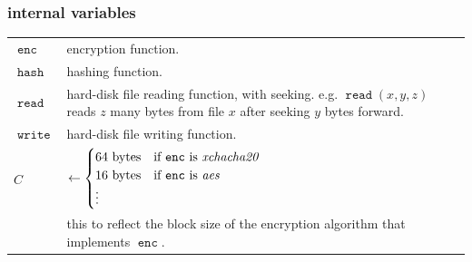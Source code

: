 \documentclass[twocolumn]{article}
\DeclareMathOperator{\fread}{\mathtt{read}}
\DeclareMathOperator{\fwrite}{\mathtt{write}}
\DeclareMathOperator{\enc}{\mathtt{enc}}
\DeclareMathOperator{\hash}{\mathtt{hash}}
\begin{document}
\subsubsection{internal variables}
\begin{tabularx}{\columnwidth}{lX}
    $\enc$      & encryption function.\\
    $\hash$     & hashing function.\\
    $\fread$    & hard-disk file reading function, with seeking.  e.g.
                    $\fread(x, y, z)$ reads $z$ many bytes from file $x$
                    after seeking $y$ bytes forward.\\
    $\fwrite$   & hard-disk file writing function.\\
    $C$         & $\gets \begin{cases}
                        64 \text{ bytes} & \text{if $\enc$ is
                                            \emph{xchacha20}}\\
                        16 \text{ bytes} & \text{if $\enc$ is \emph{aes}}\\
                        \vdots & \\
                     \end{cases}$\\
                & this to reflect the block size of the encryption
                    algorithm that implements $\enc$.\\
\end{tabularx}
\end{document}
